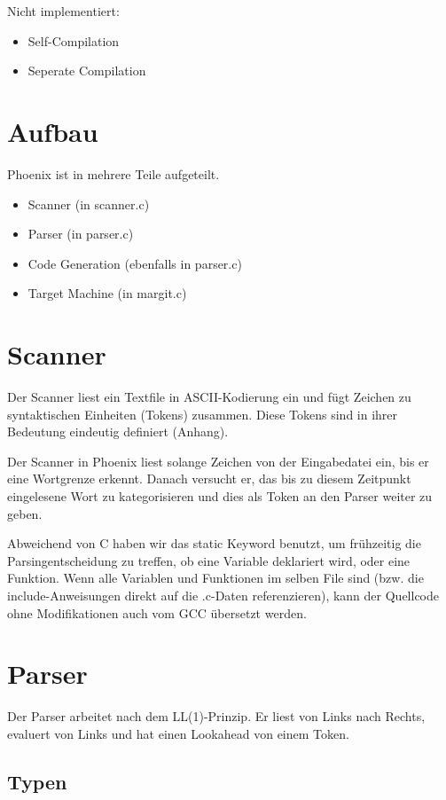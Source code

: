 \documentclass[a4paper,12pt]{article}
\begin{document}
	Nicht implementiert:
	\begin{itemize}
		\item Self-Compilation
		\item Seperate Compilation
	\end{itemize}

	\section{Aufbau}
	Phoenix ist in mehrere Teile aufgeteilt.
	\begin{itemize}
		\item Scanner (in scanner.c)
		\item Parser (in parser.c)
		\item Code Generation (ebenfalls in parser.c)
		\item Target Machine (in margit.c)
	\end{itemize}


	\section{Scanner}
	Der Scanner liest ein Textfile in ASCII-Kodierung ein und fügt Zeichen zu syntaktischen Einheiten (Tokens) zusammen.
	Diese Tokens sind in ihrer Bedeutung eindeutig definiert (Anhang).

	Der Scanner in Phoenix liest solange Zeichen von der Eingabedatei ein, bis er eine Wortgrenze erkennt.
	Danach versucht er, das bis zu diesem Zeitpunkt eingelesene Wort zu kategorisieren und dies als Token an den Parser weiter zu geben.

	Abweichend von C haben wir das static Keyword benutzt, um frühzeitig die Parsingentscheidung zu treffen, ob eine Variable deklariert wird, oder eine Funktion.
	Wenn alle Variablen und Funktionen im selben File sind (bzw. die include-Anweisungen direkt auf die .c-Daten referenzieren), kann der Quellcode ohne Modifikationen auch vom GCC übersetzt werden.

	\section{Parser}
	Der Parser arbeitet nach dem LL(1)-Prinzip. Er liest von Links nach Rechts, evaluert von Links und hat einen Lookahead von einem Token.

	\subsection{Typen}
\end{document}
